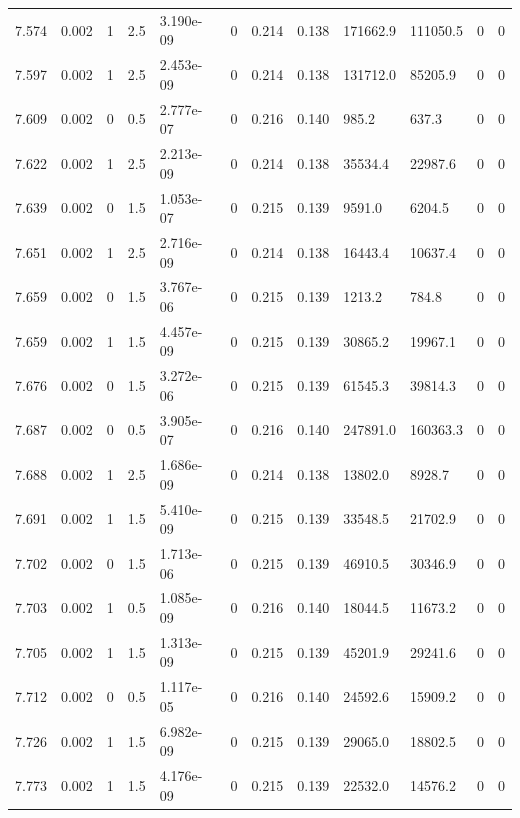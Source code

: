 \documentclass[preview]{standalone}
\begin{document}
{{{{{{{{{{{{{\begin{tabular}{L{1.2cm}C{1.2cm} C{0.3cm}C{0.5cm} C{1.4cm}C{1.4cm} C{1.4cm}C{1.4cm} C{1.6cm}C{1.6cm} C{1.6cm}C{1.6cm}}
  7.574  &  0.002  & 1     & 2.5 &  3.190e-09  & 0  &  0.214&   0.138& 171662.9 & 111050.5   &  0 & 0  \\ 
  7.597  &  0.002  & 1     & 2.5 &  2.453e-09  & 0  &  0.214&   0.138& 131712.0 & 85205.9   &  0 & 0  \\ 
  7.609  &  0.002  & 0     & 0.5 &  2.777e-07  & 0  &  0.216&   0.140& 985.2 & 637.3   &  0 & 0  \\ 
  7.622  &  0.002  & 1     & 2.5 &  2.213e-09  & 0  &  0.214&   0.138& 35534.4 & 22987.6   &  0 & 0  \\ 
  7.639  &  0.002  & 0     & 1.5 &  1.053e-07  & 0  &  0.215&   0.139& 9591.0 & 6204.5   &  0 & 0  \\ 
  7.651  &  0.002  & 1     & 2.5 &  2.716e-09  & 0  &  0.214&   0.138& 16443.4 & 10637.4   &  0 & 0  \\ 
  7.659  &  0.002  & 0     & 1.5 &  3.767e-06  & 0  &  0.215&   0.139& 1213.2 & 784.8   &  0 & 0  \\ 
  7.659  &  0.002  & 1     & 1.5 &  4.457e-09  & 0  &  0.215&   0.139& 30865.2 & 19967.1   &  0 & 0  \\ 
  7.676  &  0.002  & 0     & 1.5 &  3.272e-06  & 0  &  0.215&   0.139& 61545.3 & 39814.3   &  0 & 0  \\ 
  7.687  &  0.002  & 0     & 0.5 &  3.905e-07  & 0  &  0.216&   0.140& 247891.0 & 160363.3   &  0 & 0  \\ 
  7.688  &  0.002  & 1     & 2.5 &  1.686e-09  & 0  &  0.214&   0.138& 13802.0 & 8928.7   &  0 & 0  \\ 
  7.691  &  0.002  & 1     & 1.5 &  5.410e-09  & 0  &  0.215&   0.139& 33548.5 & 21702.9   &  0 & 0  \\ 
  7.702  &  0.002  & 0     & 1.5 &  1.713e-06  & 0  &  0.215&   0.139& 46910.5 & 30346.9   &  0 & 0  \\ 
  7.703  &  0.002  & 1     & 0.5 &  1.085e-09  & 0  &  0.216&   0.140& 18044.5 & 11673.2   &  0 & 0  \\ 
  7.705  &  0.002  & 1     & 1.5 &  1.313e-09  & 0  &  0.215&   0.139& 45201.9 & 29241.6   &  0 & 0  \\ 
  7.712  &  0.002  & 0     & 0.5 &  1.117e-05  & 0  &  0.216&   0.140& 24592.6 & 15909.2   &  0 & 0  \\ 
  7.726  &  0.002  & 1     & 1.5 &  6.982e-09  & 0  &  0.215&   0.139& 29065.0 & 18802.5   &  0 & 0  \\ 
  7.773  &  0.002  & 1     & 1.5 &  4.176e-09  & 0  &  0.215&   0.139& 22532.0 & 14576.2   &  0 & 0  \\ 

\end{tabular}}}}}}}}}}}}}}
\end{document}
